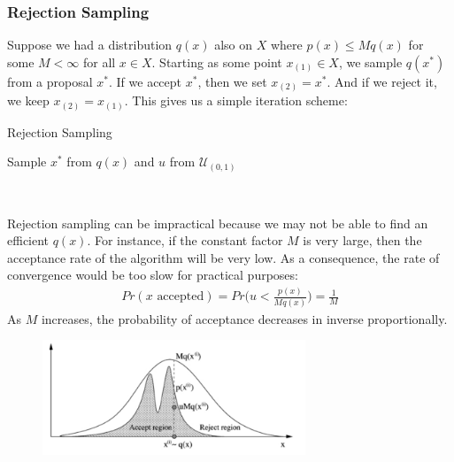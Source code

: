 \documentclass[paper=a4, fontsize=12pt]{scrartcl} %
\numberwithin{equation}{section} %
\numberwithin{figure}{section} %
\numberwithin{table}{section} %
\begin{document}
\subsubsection{Rejection Sampling}
Suppose we had a distribution $q(x)$ also on $X$ where $p(x) \le Mq(x)$ for some $M < \infty$ for all $x \in X$. 
Starting as some point $x_{(1)} \in X$, we sample $q(x^*)$ from a proposal $x^*$. If we accept $x^*$, 
then we set $x_{(2)} = x^*$. And if we reject it, we keep $x_{(2)} = x_{(1)}$.
This gives us a simple iteration scheme: \\[0.5cm]
\begin{algorithm}[H]
    \caption{Rejection Sampling}
    \SetAlgoLined
         {
            Sample $x^*$ from $q(x)$ and $u$ from $\mathcal{U}_{(0,1)}$ \:
            
            \
        }
\end{algorithm}
Rejection sampling can be impractical because we may not be able to find an efficient $q(x)$. For instance, 
if the constant factor $M$ is very large, then the acceptance rate of the algorithm 
will be very low. As a consequence, the rate of convergence would be too slow for 
practical purposes:
\begin{align*}
    Pr(x \text{ accepted}) = Pr\Big(u < \frac{p(x)}{Mq(x)} \Big) = \frac{1}{M}
\end{align*}
As $M$ increases, the probability of acceptance decreases in inverse proportionally.
\begin{figure}[H]
    \centering
    \includegraphics[width=0.7\textwidth]{images/rejection}
    \caption{}
\end{figure}

\pagebreak

\end{document}
